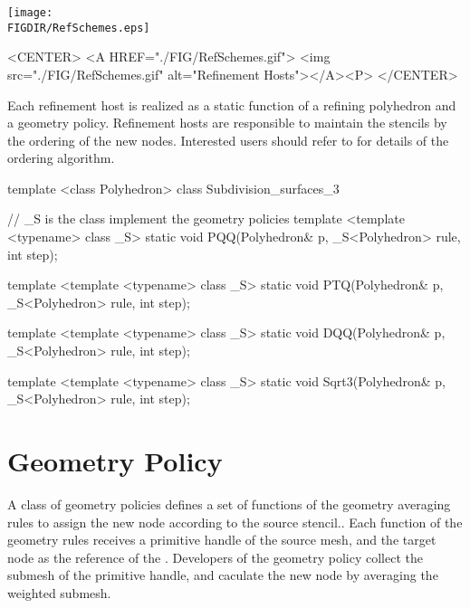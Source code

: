 \begin{ccTexOnly}
  \begin{center}
    \parbox{0.6\textwidth}{%
      \texttt{[image: \\FIGDIR/RefSchemes.eps]}%
    }
  \end{center}
\end{ccTexOnly}

\begin{ccHtmlOnly}
  <CENTER>
  <A HREF="./FIG/RefSchemes.gif">
     <img src="./FIG/RefSchemes.gif" alt="Refinement Hosts"></A><P>
  </CENTER>
\end{ccHtmlOnly}


Each refinement host is realized as a static function of
a refining polyhedron and a geometry policy. Refinement hosts
are responsible to maintain the stencils by the ordering of 
the new nodes. Interested users should refer to \cite{Shiue-2005-MREO} 
for details of the ordering algorithm.

\begin{ccExampleCode}
template <class Polyhedron>
class Subdivision_surfaces_3 {
  // _S is the class implement the geometry policies
  template <template <typename> class _S>
  static void PQQ(Polyhedron& p, _S<Polyhedron> rule, int step);

  template <template <typename> class _S>
  static void PTQ(Polyhedron& p, _S<Polyhedron> rule, int step);

  template <template <typename> class _S>
  static void DQQ(Polyhedron& p, _S<Polyhedron> rule, int step);

  template <template <typename> class _S>
  static void Sqrt3(Polyhedron& p, _S<Polyhedron> rule, int step);
}
\end{ccExampleCode}

\section{Geometry Policy}
A class of geometry policies defines a set of functions 
of the geometry averaging rules to assign the new node 
according to the source stencil..
Each function of the geometry rules receives a primitive handle 
of the source mesh, and the target node as the reference of 
the . Developers of the geometry policy collect the submesh
of the primitive handle, and caculate the new node by averaging
the weighted submesh. 

